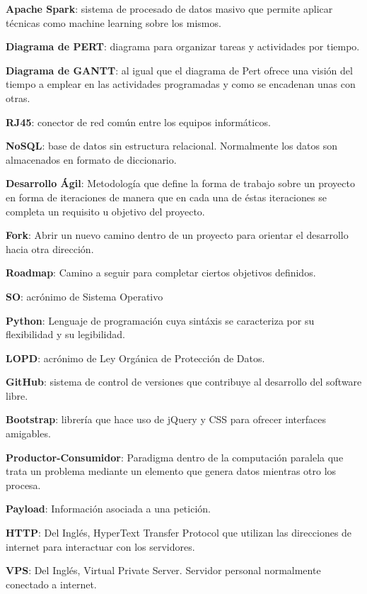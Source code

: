 \textbf{Apache Spark}: sistema de procesado de datos masivo que permite aplicar técnicas como machine learning sobre los mismos.
\bigskip

\textbf{Diagrama de PERT}: diagrama para organizar tareas y actividades por tiempo.
\bigskip

\textbf{Diagrama de GANTT}: al igual que el diagrama de Pert ofrece una visión del tiempo a emplear en las actividades programadas y como se encadenan unas con otras.
\bigskip

\textbf{RJ45}: conector de red común entre los equipos informáticos.
\bigskip

\textbf{NoSQL}: base de datos sin estructura relacional. Normalmente los datos son almacenados en formato de diccionario.
\bigskip

\textbf{Desarrollo Ágil}: Metodología que define la forma de trabajo sobre un proyecto en forma de iteraciones de manera que en cada una de éstas iteraciones se completa un requisito u objetivo del proyecto.
\bigskip

\textbf{Fork}: Abrir un nuevo camino dentro de un proyecto para orientar el desarrollo hacia otra dirección.
\bigskip


\textbf{Roadmap}: Camino a seguir para completar ciertos objetivos definidos.
\bigskip

\textbf{SO}: acrónimo de Sistema Operativo
\bigskip

\textbf{Python}: Lenguaje de programación cuya sintáxis se caracteriza por su flexibilidad y su legibilidad.
\bigskip

\textbf{LOPD}: acrónimo de Ley Orgánica de Protección de Datos.
\bigskip

\textbf{GitHub}: sistema de control de versiones que contribuye al desarrollo del software libre.
\bigskip

\textbf{Bootstrap}: librería que hace uso de jQuery y CSS para ofrecer interfaces amigables.
\bigskip

\textbf{Productor-Consumidor}: Paradigma dentro de la computación paralela que trata un problema mediante un elemento que genera datos mientras otro los procesa.
\bigskip

\textbf{Payload}: Información asociada a una petición.
\bigskip

\textbf{HTTP}: Del Inglés, HyperText Transfer Protocol que utilizan las direcciones de internet para interactuar con los servidores.
\bigskip

\textbf{VPS}: Del Inglés, Virtual Private Server. Servidor personal normalmente conectado a internet.
\bigskip

